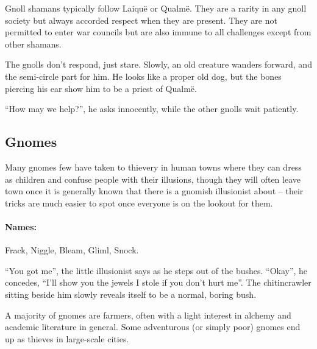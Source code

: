 \begin{multicols}{2}
\begin{boxtext}
\end{boxtext}

\label{gnoll_shaman}

Gnoll shamans typically follow Laiqu\"{e} or Qualm\"{e}.  They are a rarity in any gnoll society but always accorded respect when they are present.  They are not permitted to enter war councils but are also immune to all challenges except from other shamans.


\begin{boxtext}

  The gnolls don't respond, just stare.  
  Slowly, an old creature wanders forward, and the semi-circle part for him.
  He looks like a proper old dog, but the bones piercing his ear show him to be a priest of Qualm\"{e}.

  ``How may we help?'', he asks innocently, while the other gnolls wait patiently.

\end{boxtext}

\subsection{Gnomes}

Many gnomes few have taken to thievery in human towns where they can dress as children and confuse people with their illusions, though they will often leave town once it is generally known that there is a gnomish illusionist about -- their tricks are much easier to spot once everyone is on the lookout for them.

\paragraph{Names:} Frack, Niggle, Bleam, Gliml, Snock.

\begin{boxtext}

  ``You got me'', the little illusionist says as he steps out of the bushes.
  ``Okay'', he concedes, ``I'll show you the jewels I stole if you don't hurt me''.
  The chitincrawler sitting beside him slowly reveals itself to be a normal, boring bush.

\end{boxtext}

\label{gnomish_citizen}

A majority of gnomes are farmers, often with a light interest in alchemy and academic literature in general.  Some adventurous (or simply poor) gnomes end up as thieves in large-scale cities.


\end{multicols}
